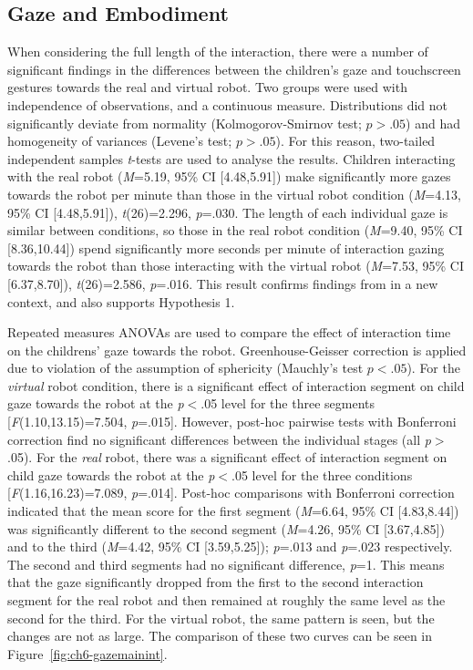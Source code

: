 \subsection{Gaze and Embodiment}
When considering the full length of the interaction, there were a number of significant findings in the differences between the children's gaze and touchscreen gestures towards the real and virtual robot. Two groups were used with independence of observations, and a continuous measure. Distributions did not significantly deviate from normality (Kolmogorov-Smirnov test; $\textit{p}>.05$) and had homogeneity of variances (Levene's test; $\textit{p}>.05$). For this reason, two-tailed independent samples \textit{t}-tests are used to analyse the results. Children interacting with the real robot (\textit{M}=5.19, 95\% CI [4.48,5.91]) make significantly more gazes towards the robot per minute than those in the virtual robot condition (\textit{M}=4.13, 95\% CI [4.48,5.91]), \textit{t}(26)=2.296, \textit{p}=.030. The length of each individual gaze is similar between conditions, so those in the real robot condition (\textit{M}=9.40, 95\% CI [8.36,10.44]) spend significantly more seconds per minute of interaction gazing towards the robot than those interacting with the virtual robot (\textit{M}=7.53, 95\% CI [6.37,8.70]), \textit{t}(26)=2.586, \textit{p}=.016. This result confirms findings from \cite{looije2012help} in a new context, and also supports Hypothesis 1.

Repeated measures ANOVAs are used to compare the effect of interaction time on the childrens' gaze towards the robot. Greenhouse-Geisser correction is applied due to violation of the assumption of sphericity (Mauchly's test $\textit{p}<.05$). For the \textit{virtual} robot condition, there is a significant effect of interaction segment on child gaze towards the robot at the \textit{p}$<$.05 level for the three segments [\textit{F}(1.10,13.15)=7.504, \textit{p}=.015]. However, post-hoc pairwise tests with Bonferroni correction find no significant differences between the individual stages (all \textit{p}$>$.05). For the \textit{real} robot, there was a significant effect of interaction segment on child gaze towards the robot at the \textit{p}$<$.05 level for the three conditions [\textit{F}(1.16,16.23)=7.089, \textit{p}=.014]. Post-hoc comparisons with Bonferroni correction indicated that the mean score for the first segment (\textit{M}=6.64, 95\% CI [4.83,8.44]) was significantly different to the second segment (\textit{M}=4.26, 95\% CI [3.67,4.85]) and to the third (\textit{M}=4.42, 95\% CI [3.59,5.25]); \textit{p}=.013 and \textit{p}=.023 respectively. The second and third segments had no significant difference, \textit{p}=1. This means that the gaze significantly dropped from the first to the second interaction segment for the real robot and then remained at roughly the same level as the second for the third. For the virtual robot, the same pattern is seen, but the changes are not as large. The comparison of these two curves can be seen in Figure~\ref{fig:ch6-gazemainint}.

